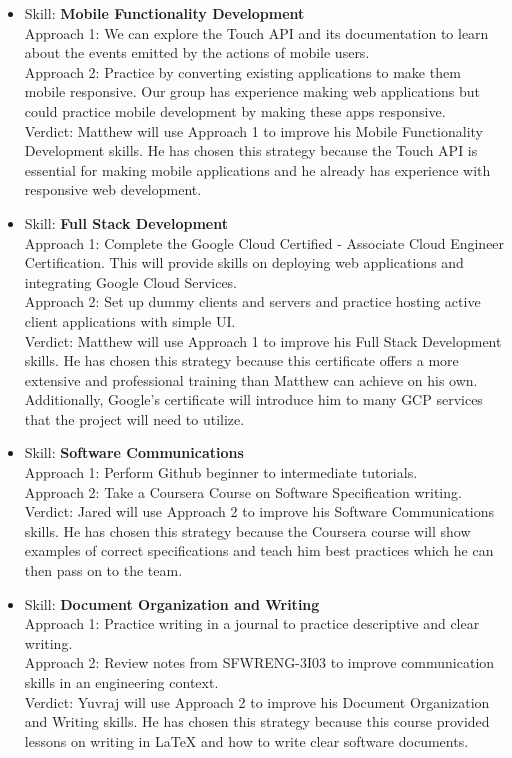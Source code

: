 \documentclass[12pt]{article}
\begin{document}
\begin{itemize}
		\item Skill: \textbf{Mobile Functionality Development}
		\\ Approach 1: We can explore the Touch API and its documentation to learn about the events emitted by the actions of mobile users.
		\\ Approach 2: Practice by converting existing applications to make them mobile responsive. Our group has experience making web applications but could practice mobile development by making these apps responsive.
		\\ Verdict: Matthew will use Approach 1 to improve his Mobile Functionality Development skills. He has chosen this strategy because the Touch API is essential for making mobile applications and he already has experience with responsive web development.
		
		\item Skill: \textbf{Full Stack Development}
		\\ Approach 1: Complete the Google Cloud Certified - Associate Cloud Engineer Certification. This will provide skills on deploying web applications and integrating Google Cloud Services.
		\\ Approach 2: Set up dummy clients and servers and practice hosting active client applications with simple UI.
		\\ Verdict: Matthew will use Approach 1 to improve his Full Stack Development skills. He has chosen this strategy because this certificate offers a more extensive and professional training than Matthew can achieve on his own. Additionally, Google's certificate will introduce him to many GCP services that the project will need to utilize.
		
		\item Skill: \textbf{Software Communications}
		\\ Approach 1: Perform Github beginner to intermediate tutorials.
		\\ Approach 2: Take a Coursera Course on Software Specification writing.
		\\ Verdict: Jared will use Approach 2 to improve his Software Communications skills. He has chosen this strategy because the Coursera course will show examples of correct specifications and teach him best practices which he can then pass on to the team.
		
		\item Skill: \textbf{Document Organization and Writing}
		\\ Approach 1: Practice writing in a journal to practice descriptive and clear writing.
		\\ Approach 2: Review notes from SFWRENG-3I03 to improve communication skills in an engineering context.
		\\ Verdict: Yuvraj will use Approach 2 to improve his Document Organization and Writing skills. He has chosen this strategy because this course provided lessons on writing in LaTeX and how to write clear software documents. 
		

\end{itemize}
\end{document}
